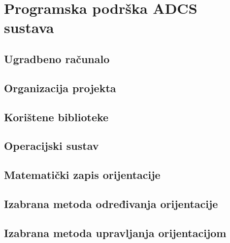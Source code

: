 \documentclass[times, utf8, diplomski, numeric]{templates/template}
\begin{document}
\chapter{Programska podrška ADCS sustava}{
    \section{Ugradbeno računalo}{
    }

    \section{Organizacija projekta}{
    }
    
    \section{Korištene biblioteke}{
    }

    \section{Operacijski sustav}{
    }

    \section{Matematički zapis orijentacije}{
    }

    \section{Izabrana metoda određivanja orijentacije}{
    }

    \section{Izabrana metoda upravljanja orijentacijom}{
    }

}
\end{document}
